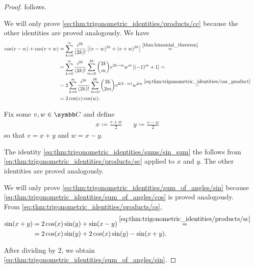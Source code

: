 \begin{proof}
   follows.

   We will only prove \eqref{eq:thm:trigonometric_identities/products/cc} because the other identities are proved analogously. We have
  \begin{align*}
    \cos(v - w) + \cos(v + w)
    &=
    \sum_{k=0}^\infty \frac {i^{2k}} {(2k)!} \left[(v - w)^{2k} + (v + w)^{2k} \right]
    \overset {\ref{thm:binomial_theorem}} = \\ &=
    \sum_{k=0}^\infty \frac {i^{2k}} {(2k)!} \sum_{m=0}^{2k} \binom {2k} m v^{2k-m} w^m \left[ (-1)^m + 1 \right]
    = \\ &=
    2 \sum_{k=0}^\infty \frac {i^{2k}} {(2k)!} \sum_{m=0}^{2k} \binom {2k} {2m} v^{2(k-m)} w^{2m}
    \overset {\eqref{eq:thm:trigonometric_identities/cos_product}} = \\ &=
    2 \cos(v) \cos(w).
  \end{align*}

   Fix some \( v, w \in \BC \) and define
  \begin{align*}
    x \coloneqq \frac {v + w} 2
    &&
    y \coloneqq \frac {v - w} 2
  \end{align*}
  so that \( v = x + y \) and \( w = x - y \).

  The identity \eqref{eq:thm:trigonometric_identities/sums/sin_sum} the follows from \eqref{eq:thm:trigonometric_identities/products/sc} applied to \( x \) and \( y \). The other identities are proved analogously.

   We will only prove \eqref{eq:thm:trigonometric_identities/sum_of_angles/sin} because \eqref{eq:thm:trigonometric_identities/sum_of_angles/cos} is proved analogously. From \eqref{eq:thm:trigonometric_identities/products/cs},
  \begin{align*}
    \sin(x + y)
     & =
    2 \cos(x) \sin(y) + \sin(x - y)
    \overset {\eqref{eq:thm:trigonometric_identities/products/sc}} = \\ &=
    2 \cos(x) \sin(y) + 2 \cos(x) \sin(y) - \sin(x + y).
  \end{align*}

  After dividing by \( 2 \), we obtain \eqref{eq:thm:trigonometric_identities/sum_of_angles/sin}.
\end{proof}

